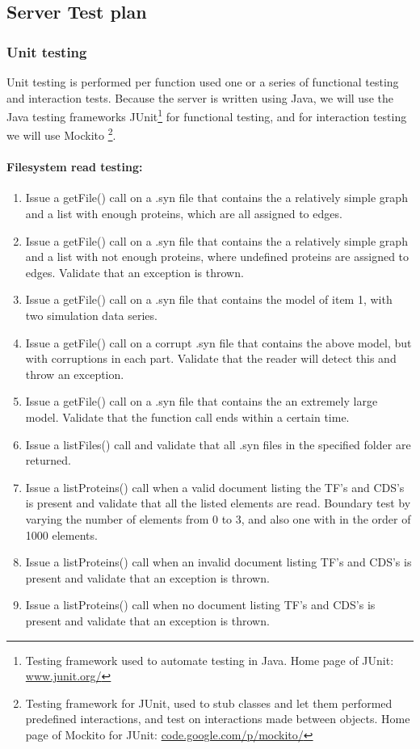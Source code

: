 \subsection{Server Test plan}

\subsubsection{Unit testing}
Unit testing is performed per function used one or a series of functional testing and interaction tests. Because the server is written using Java, we will use the Java testing frameworks JUnit\footnote{Testing framework used to automate testing in Java. Home page of JUnit: \url{www.junit.org/}} for functional testing, and for interaction testing we will use Mockito \footnote{Testing framework for JUnit, used to stub classes and let them performed predefined interactions, and test on interactions made between objects. Home page of Mockito for JUnit: \url{code.google.com/p/mockito/}}.

\paragraph{Filesystem read testing:}

\begin{enumerate}
\item Issue a getFile() call on a .syn file that contains the a relatively simple graph  and a list with enough proteins, which are all assigned to edges.

\item Issue a getFile() call on a .syn file that contains the a relatively simple graph  and a list with not enough proteins, where undefined proteins are assigned to edges. Validate that an exception is thrown.\item Issue a getFile() call on  a .syn file that contains the  model of item 1, with two simulation data series.
\item Issue a getFile() call on  a corrupt .syn file that contains the above model, but with corruptions in each part.
Validate that the reader will detect this and throw an exception.
\item Issue a getFile() call on  a .syn file that contains the an extremely large model. Validate that the function call ends within a certain time. 
\item Issue a listFiles() call and validate that all .syn files in the specified folder are returned.

\item Issue a listProteins() call when a valid document listing the TF's and CDS's is present and validate that all the listed elements are read.
 Boundary test by varying the number of elements from 0 to 3, and also one with in the order of 1000 elements.\item Issue a listProteins() call when an  invalid document listing TF's and CDS's is present and validate that an exception is thrown.
\item Issue a listProteins() call when no document listing TF's and CDS's is present and validate that an exception is thrown.\end{enumerate}

